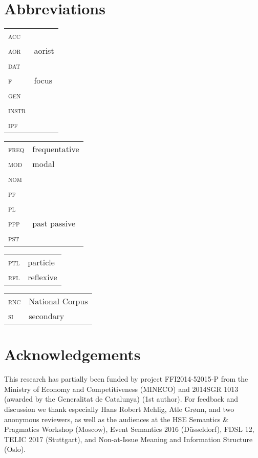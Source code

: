 \documentclass[output=paper,modfonts,newtxmath,hidelinks
\ChapterDOI{10.5281/zenodo.2545513}
]{langscibook}
\begin{document}
\largerpage[2]
\section*{Abbreviations}

\begin{tabularx}{.5\textwidth}{@{}lQ@{}}
\textsc{acc}&\\
\textsc{aor}&aorist\\
\textsc{dat}&\\
\textsc{f}&focus\\
\textsc{gen}&\\
\textsc{instr}&\\
\textsc{ipf}&\\
\end{tabularx}%
\begin{tabularx}{.5\textwidth}{@{}lQ@{}}
\textsc{freq}&frequentative\\
\textsc{mod}&modal\\
\textsc{nom}&\\
\textsc{pf}&\\
\textsc{pl}&\\
\textsc{ppp}&past passive \\
\textsc{pst}&\\
\end{tabularx}%

\begin{tabularx}{.5\textwidth}{@{}lQ@{}}
\textsc{ptl}&particle\\
\textsc{rfl}&reflexive\\
\end{tabularx}%
\begin{tabularx}{.5\textwidth}{@{}lQ@{}}
\textsc{rnc}& National Corpus\\
\textsc{si}&secondary \\
\end{tabularx}


\section*{Acknowledgements}

This research has partially been funded by project FFI2014-52015-P from the Ministry of Economy and Competitiveness (MINECO) and 2014SGR 1013 (awarded by the Generalitat de Catalunya) (1st author). For feedback and discussion we thank especially Hans Robert Mehlig, Atle Grønn, and  two anonymous reviewers, as well as the audiences at the HSE Semantics \& Pragmatics Workshop (Moscow), Event Semantics 2016 (D\"{u}sseldorf), FDSL 12, TELIC 2017 (Stuttgart), and Non-at-Issue Meaning and Information Structure (Oslo).

\largerpage
\sloppy\printbibliography[heading=subbibliography,notkeyword=this]
\end{document}
